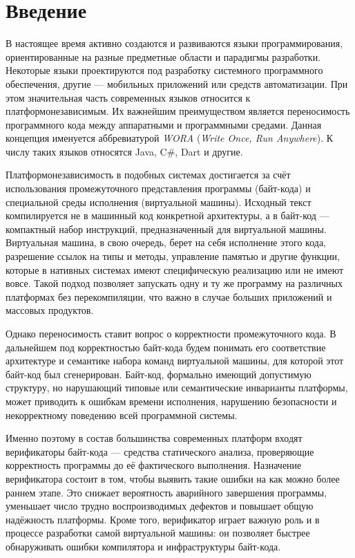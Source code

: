 \section{Введение}
\label{sec:Chapter0} 

В настоящее время активно создаются и развиваются языки программирования, ориентированные на разные
предметные области и парадигмы разработки. Некоторые языки проектируются под разработку системного
программного обеспечения, другие --- мобильных приложений или средств автоматизации. 
При этом значительная часть современных языков
относится к платформонезависимым. Их важнейшим преимуществом является переносимость программного
кода между аппаратными и программными средами. Данная концепция именуется аббревиатурой
\textit{WORA} (\textit{Write Once, Run Anywhere}). К числу таких языков относятся Java, C\#, Dart и другие.

Платформонезависимость в подобных системах достигается за счёт использования промежуточного
представления программы (байт-кода) и специальной среды исполнения (виртуальной машины). Исходный текст 
компилируется не в
машинный код конкретной архитектуры, а в байт-код --- компактный набор инструкций, предназначенный
для виртуальной машины. Виртуальная машина, в свою очередь, берет на себя исполнение этого кода,
разрешение ссылок на типы и методы, управление памятью и другие функции, которые в нативных
системах имеют специфическую реализацию или не имеют вовсе. Такой подход позволяет запускать одну и ту же программу на
различных платформах без перекомпиляции, что важно в случае больших приложений и массовых продуктов.

Однако переносимость ставит вопрос о
корректности промежуточного кода. В дальнейшем под корректностью байт-кода будем понимать его
соответствие архитектуре и семантике набора команд виртуальной машины, для которой этот байт-код был сгенерирован. Байт-код, формально имеющий допустимую
структуру, но нарушающий типовые или семантические инварианты платформы, может приводить к
ошибкам времени исполнения, нарушению безопасности и некорректному поведению всей программной
системы.

Именно поэтому в состав большинства современных платформ входят верификаторы байт-кода --- средства
статического анализа, проверяющие корректность программы до её фактического выполнения. Назначение
верификатора состоит в том, чтобы выявить такие ошибки на как можно более раннем этапе. Это
снижает вероятность аварийного завершения программы, уменьшает число трудно
воспроизводимых дефектов и повышает общую надёжность платформы. Кроме того, верификатор играет
важную роль и в процессе разработки самой виртуальной машины: он позволяет быстрее обнаруживать
ошибки компилятора и инфраструктуры байт-кода.

